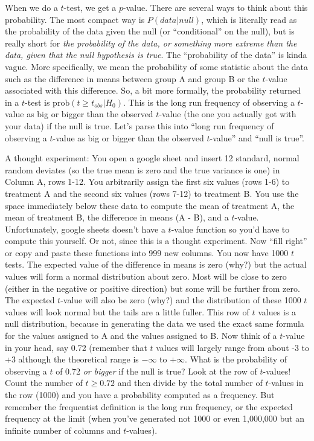 \documentclass[]{book}
\begin{document}
When we do a \(t\)-test, we get a \(p\)-value. There are several ways to
think about this probability. The most compact way is
\(P(data | null)\), which is literally read as the probability of the
data given the null (or ``conditional'' on the null), but is really
short for \emph{the probability of the data, or something more extreme
than the data, given that the null hypothesis is true}. The
``probability of the data'' is kinda vague. More specifically, we mean
the probability of some statistic about the data such as the difference
in means between group A and group B or the \(t\)-value associated with
this difference. So, a bit more formally, the probability returned in a
\(t\)-test is \(\mathrm{prob}(t \ge t_{obs} | H_0)\). This is the long
run frequency of observing a \(t\)-value as big or bigger than the
observed \(t\)-value (the one you actually got with your data) if the
null is true. Let's parse this into ``long run frequency of observing a
\(t\)-value as big or bigger than the observed \(t\)-value'' and ``null
is true''.

A thought experiment: You open a google sheet and insert 12 standard,
normal random deviates (so the true mean is zero and the true variance
is one) in Column A, rows 1-12. You arbitrarily assign the first six
values (rows 1-6) to treatment A and the second six values (rows 7-12)
to treatment B. You use the space immediately below these data to
compute the mean of treatment A, the mean of treatment B, the difference
in means (A - B), and a \(t\)-value. Unfortunately, google sheets
doesn't have a \(t\)-value function so you'd have to compute this
yourself. Or not, since this is a thought experiment. Now ``fill right''
or copy and paste these functions into 999 new columns. You now have
1000 \(t\) tests. The expected value of the difference in means is zero
(why?) but the actual values will form a normal distribution about zero.
Most will be close to zero (either in the negative or positive
direction) but some will be further from zero. The expected \(t\)-value
will also be zero (why?) and the distribution of these 1000 \(t\) values
will look normal but the tails are a little fuller. This row of \(t\)
values is a null distribution, because in generating the data we used
the exact same formula for the values assigned to A and the values
assigned to B. Now think of a \(t\)-value in your head, say 0.72
(remember that \(t\) values will largely range from about -3 to +3
although the theoretical range is \(-\infty\) to \(+\infty\). What is
the probability of observing a \(t\) of 0.72 \emph{or bigger} if the
null is true? Look at the row of \(t\)-values! Count the number of
\(t \ge 0.72\) and then divide by the total number of \(t\)-values in
the row (1000) and you have a probability computed as a frequency. But
remember the frequentist definition is the long run frequency, or the
expected frequency at the limit (when you've generated not 1000 or even
1,000,000 but an infinite number of columns and \(t\)-values).
\end{document}
